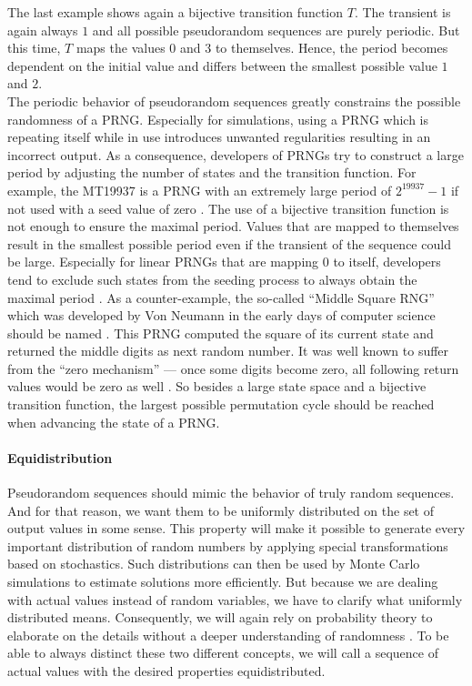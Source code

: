 \documentclass{stdlocal}
\begin{document}
    \noindent
    The last example shows again a bijective transition function $T$.
    The transient is again always $1$ and all possible pseudorandom sequences are purely periodic.
    But this time, $T$ maps the values $0$ and $3$ to themselves.
    Hence, the period becomes dependent on the initial value and differs between the smallest possible value $1$ and $2$.\\
    The periodic behavior of pseudorandom sequences greatly constrains the possible randomness of a PRNG.
    Especially for simulations, using a PRNG which is repeating itself while in use introduces unwanted regularities resulting in an incorrect output.
    As a consequence, developers of PRNGs try to construct a large period by adjusting the number of states and the transition function.
    For example, the MT19937 is a PRNG with an extremely large period of $2^{19937}-1$ if not used with a seed value of zero \autocite{matsumoto1998}.
    The use of a bijective transition function is not enough to ensure the maximal period.
    Values that are mapped to themselves result in the smallest possible period even if the transient of the sequence could be large.
    Especially for linear PRNGs that are mapping $0$ to itself, developers tend to exclude such states from the seeding process to always obtain the maximal period \autocite{marsaglia2003,blackman2019}.
    As a counter-example, the so-called \enquote{Middle Square RNG} which was developed by Von Neumann in the early days of computer science should be named \autocites[\ppno~12-15]{kneusel2018}{widynski2019}.
    This PRNG computed the square of its current state and returned the middle digits as next random number.
    It was well known to suffer from the \enquote{zero mechanism} --- once some digits become zero, all following return values would be zero as well \autocites[\ppno~12-15]{kneusel2018}{widynski2019}.
    So besides a large state space and a bijective transition function, the largest possible permutation cycle should be reached when advancing the state of a PRNG.

    \paragraph{Equidistribution}
    Pseudorandom sequences should mimic the behavior of truly random sequences.
    And for that reason, we want them to be uniformly distributed on the set of output values in some sense.
    This property will make it possible to generate every important distribution of random numbers by applying special transformations based on stochastics.
    Such distributions can then be used by Monte Carlo simulations to estimate solutions more efficiently.
    But because we are dealing with actual values instead of random variables, we have to clarify what uniformly distributed means.
    Consequently, we will again rely on probability theory to elaborate on the details without a deeper understanding of randomness \autocite{eisner2019}.
    To be able to always distinct these two different concepts, we will call a sequence of actual values with the desired properties equidistributed.
\end{document}

